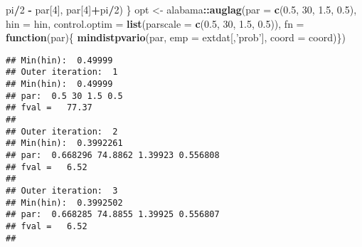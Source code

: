 \documentclass[]{book}
\newenvironment{Shaded}{\begin{snugshade}}{\end{snugshade}}
\newcommand{\ControlFlowTok}[1]{\textcolor[rgb]{0.13,0.29,0.53}{\textbf{#1}}}
\newcommand{\DataTypeTok}[1]{\textcolor[rgb]{0.13,0.29,0.53}{#1}}
\newcommand{\DecValTok}[1]{\textcolor[rgb]{0.00,0.00,0.81}{#1}}
\newcommand{\FloatTok}[1]{\textcolor[rgb]{0.00,0.00,0.81}{#1}}
\newcommand{\KeywordTok}[1]{\textcolor[rgb]{0.13,0.29,0.53}{\textbf{#1}}}
\newcommand{\NormalTok}[1]{#1}
\newcommand{\OperatorTok}[1]{\textcolor[rgb]{0.81,0.36,0.00}{\textbf{#1}}}
\newcommand{\StringTok}[1]{\textcolor[rgb]{0.31,0.60,0.02}{#1}}
\begin{document}
\begin{Shaded}
\begin{Highlighting}[]
\NormalTok{     pi}\OperatorTok{/}\DecValTok{2} \OperatorTok{-}\StringTok{ }\NormalTok{par[}\DecValTok{4}\NormalTok{],}
\NormalTok{     par[}\DecValTok{4}\NormalTok{]}\OperatorTok{+}\NormalTok{pi}\OperatorTok{/}\DecValTok{2}\NormalTok{)}
\NormalTok{   \}}
\NormalTok{ opt <-}\StringTok{ }\NormalTok{alabama}\OperatorTok{::}\KeywordTok{auglag}\NormalTok{(}\DataTypeTok{par =} \KeywordTok{c}\NormalTok{(}\FloatTok{0.5}\NormalTok{, }\DecValTok{30}\NormalTok{, }\FloatTok{1.5}\NormalTok{, }\FloatTok{0.5}\NormalTok{),}
                        \DataTypeTok{hin =}\NormalTok{ hin, }\DataTypeTok{control.optim =} \KeywordTok{list}\NormalTok{(}\DataTypeTok{parscale =} \KeywordTok{c}\NormalTok{(}\FloatTok{0.5}\NormalTok{, }\DecValTok{30}\NormalTok{, }\FloatTok{1.5}\NormalTok{, }\FloatTok{0.5}\NormalTok{)),}
                         \DataTypeTok{fn =} \ControlFlowTok{function}\NormalTok{(par)\{}
                           \KeywordTok{mindistpvario}\NormalTok{(par, }\DataTypeTok{emp =}\NormalTok{ extdat[,}\StringTok{'prob'}\NormalTok{], }\DataTypeTok{coord =}\NormalTok{ coord)\})}
\end{Highlighting}
\end{Shaded}

\begin{verbatim}
## Min(hin):  0.49999 
## Outer iteration:  1 
## Min(hin):  0.49999 
## par:  0.5 30 1.5 0.5 
## fval =   77.37 
##  
## Outer iteration:  2 
## Min(hin):  0.3992261 
## par:  0.668296 74.8862 1.39923 0.556808 
## fval =   6.52 
##  
## Outer iteration:  3 
## Min(hin):  0.3992502 
## par:  0.668285 74.8855 1.39925 0.556807 
## fval =   6.52 
## 
\end{verbatim}
\end{document}

